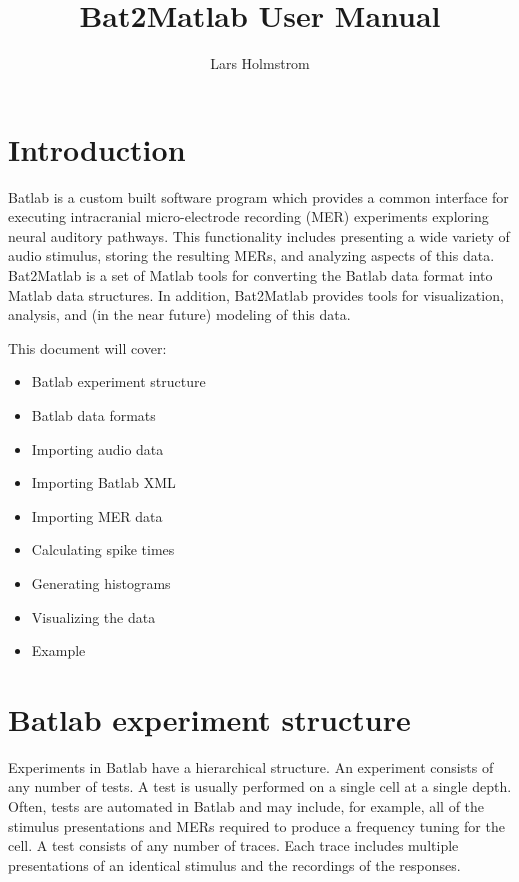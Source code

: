 \documentclass[11pt,letterpaper]{article}
\begin{document}
\title{Bat2Matlab User Manual}
\author{Lars Holmstrom}
\maketitle

\section{Introduction}
Batlab is a custom built software program which provides a common
interface for executing intracranial micro-electrode recording (MER)
experiments exploring neural auditory pathways. This functionality
includes presenting a wide variety of audio stimulus, storing the
resulting MERs, and analyzing aspects of this data. Bat2Matlab is a
set of Matlab tools for converting the Batlab data format into
Matlab data structures. In addition, Bat2Matlab provides tools for
visualization, analysis, and (in the near future) modeling of this
data.

This document will cover:
\begin{itemize}
\item Batlab experiment structure
\item Batlab data formats
\item Importing audio data
\item Importing Batlab XML
\item Importing MER data
\item Calculating spike times
\item Generating histograms
\item Visualizing the data
\item Example
\end{itemize}
\section{Batlab experiment structure}
Experiments in Batlab have a hierarchical structure. An experiment
consists of any number of tests. A test is usually performed on a
single cell at a single depth. Often, tests are automated in Batlab
and may include, for example, all of the stimulus presentations and
MERs required to produce a frequency tuning for the cell. A test
consists of any number of traces. Each trace includes multiple
presentations of an identical stimulus and the recordings of the
responses.
\end{document}

